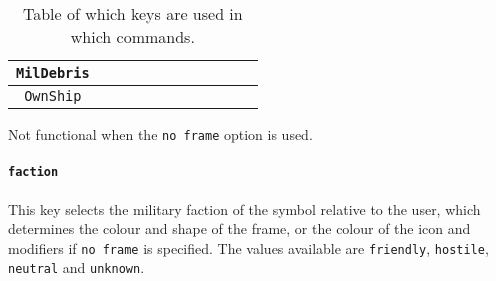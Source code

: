 \documentclass[a4paper, titlepage]{article}
\begin{document}
\begin{table}[H]
\begin{tabular}{|c|c|c|c|c|c|c|c|c|c|c|}
\texttt{MilDebris} & \cellcolor{gray} & \cellcolor{gray} & \cellcolor{gray} & \cellcolor{gray} & \cellcolor{gray} & \cellcolor{gray} & \cellcolor{gray} &  \cellcolor{gray} & \cellcolor{gray} & \cellcolor{gray}\\ \hline
\texttt{OwnShip} & \cellcolor{gray} & \cellcolor{gray} & \cellcolor{gray} & \cellcolor{gray} & \cellcolor{gray} & \cellcolor{gray} & \cellcolor{gray} &  \cellcolor{gray} & \cellcolor{gray} & \cellcolor{gray}\\ \hline
\end{tabular}
\begin{tablenotes}
\item \qquad \quad  *Not functional when the \texttt{no frame} option is used.
\end{tablenotes}
\caption{Table of which keys are used in which commands.}
\label{shared}
\end{table}


\paragraph{\texttt{faction}}

This key selects the military faction of the symbol relative to the user, which determines the colour and shape of the frame, or the colour of the icon and modifiers if \texttt{no frame} is specified. The values available are \texttt{friendly}, \texttt{hostile}, \texttt{neutral} and \texttt{unknown}.
\end{document}
